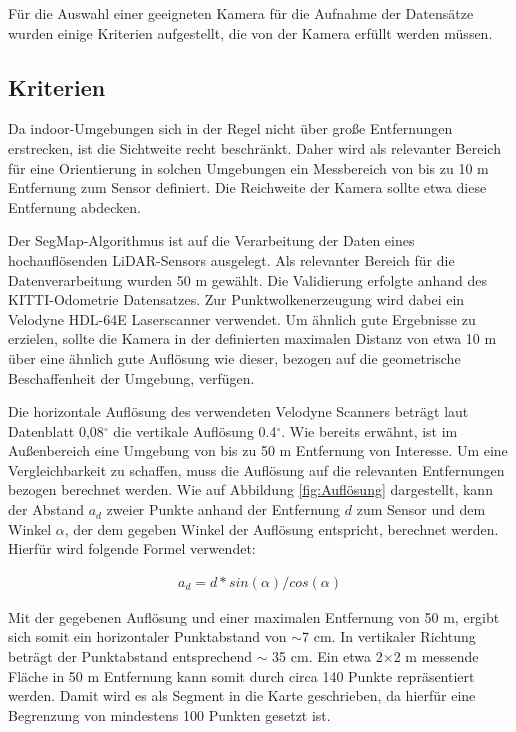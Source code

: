 Für die Auswahl einer geeigneten Kamera für die Aufnahme der Datensätze wurden einige Kriterien aufgestellt, die von der Kamera erfüllt werden müssen. 

\subsection[Kriterien (Kopp)]{Kriterien}

Da indoor-Umgebungen sich in der Regel nicht über große Entfernungen erstrecken, ist die Sichtweite recht beschränkt. Daher wird als relevanter Bereich für eine Orientierung in solchen Umgebungen ein Messbereich von bis zu 10 m Entfernung zum Sensor definiert. Die Reichweite der Kamera sollte etwa diese Entfernung abdecken. 

Der SegMap-Algorithmus ist auf die Verarbeitung der Daten eines hochauflösenden LiDAR-Sensors ausgelegt. Als relevanter Bereich für die Datenverarbeitung wurden 50 m gewählt. Die Validierung erfolgte anhand des KITTI-Odometrie Datensatzes. Zur Punktwolkenerzeugung wird dabei ein Velodyne HDL-64E Laserscanner verwendet. Um ähnlich gute Ergebnisse  zu erzielen, sollte die Kamera in der definierten maximalen Distanz von etwa 10 m über eine ähnlich gute Auflösung wie dieser, bezogen auf die geometrische Beschaffenheit der Umgebung, verfügen.

Die horizontale Auflösung des verwendeten Velodyne Scanners beträgt laut Datenblatt 0,08$^\circ$ die vertikale Auflösung 0.4$^\circ$. Wie bereits erwähnt, ist im Außenbereich eine Umgebung von bis zu 50 m Entfernung von Interesse. Um eine Vergleichbarkeit zu schaffen, muss die Auflösung auf die relevanten Entfernungen bezogen berechnet werden. Wie auf Abbildung \ref{fig:Auflösung} dargestellt, kann der Abstand $a_d$ zweier Punkte anhand der Entfernung $d$ zum Sensor und dem Winkel $\alpha$, der dem gegeben Winkel der Auflösung entspricht, berechnet werden. Hierfür wird folgende Formel verwendet:

\begin{align}
	a_d= d*sin(\alpha)/cos(\alpha)
\end{align}

Mit der gegebenen Auflösung und einer maximalen Entfernung von 50 m, ergibt sich somit ein horizontaler Punktabstand von $\sim$7 cm. In vertikaler Richtung beträgt der Punktabstand entsprechend $\sim$ 35 cm. Ein etwa 2$\times$2 m messende Fläche in 50 m Entfernung kann somit durch circa 140 Punkte repräsentiert werden. Damit wird es als Segment in die Karte geschrieben, da hierfür eine Begrenzung von mindestens 100 Punkten gesetzt ist. 

